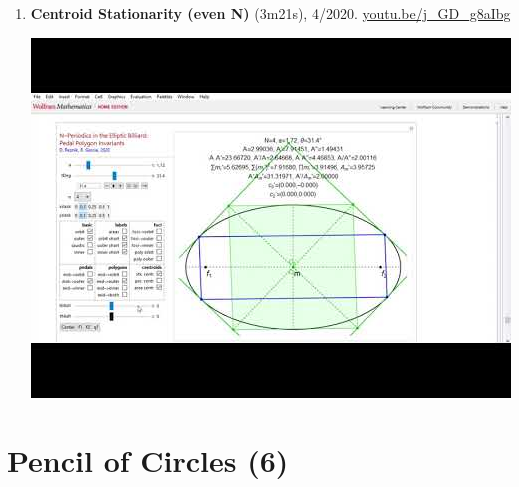 \documentclass[12pt]{article}
\begin{document}
\begin{enumerate}[resume]
% 
\item \textbf{Centroid Stationarity (even N)} (3m21s), 4/2020. \href{https://youtu.be/j_GD_g8aIbg}{\url{youtu.be/j\_GD\_g8aIbg}}
\begin{center}\includegraphics[width=.5\textwidth]{pics/j_GD_g8aIbg.jpg}\end{center}
% 
\end{enumerate}

\section{Pencil of Circles (6)}
\end{document}
